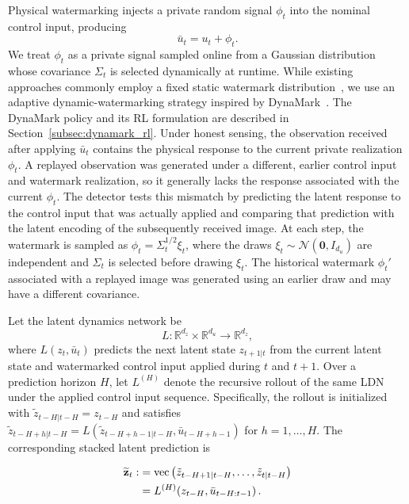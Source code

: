 \documentclass[letterpaper, 10 pt, conference]{ieeeconf}
\theoremstyle{plain}
\begin{document}
Physical watermarking injects a private random signal $\phi_t$ into the nominal control input, producing
\begin{equation}\label{eq:u_phi}
    \bar u_t = u_t + \phi_t.
\end{equation}
We treat $\phi_t$ as a private signal sampled online from a Gaussian distribution whose covariance $\Sigma_t$ is selected dynamically at runtime. While existing approaches commonly employ a fixed static watermark distribution~\cite{mo2009secure,satchidanandan2017dynamic,naha2023sequential}, we use an adaptive dynamic-watermarking strategy inspired by DynaMark~\cite{aftabi2025dynamark}. The DynaMark policy and its RL formulation are described in Section~\ref{subsec:dynamark_rl}.  Under honest sensing, the observation received after applying $\bar u_t$ contains the physical response to the current private realization $\phi_t$. A replayed observation was generated under a different, earlier control input and watermark realization, so it generally lacks the response associated with the current $\phi_t$. The detector tests this mismatch by predicting the latent response to the control input that was actually applied and comparing that prediction with the latent encoding of the subsequently received image. At each step, the watermark is sampled as $\phi_t=\Sigma_t^{1/2}\xi_t$, where the draws $\xi_t\sim\mathcal{N}(\mathbf{0},I_{d_u})$ are independent and $\Sigma_t$ is selected before drawing $\xi_t$. The historical watermark $\phi_t'$ associated with a replayed image was generated using an earlier draw and may have a different covariance.

Let the latent dynamics network be
\begin{equation}\label{eq:ldn_map}
    L:\mathbb{R}^{d_z}\times\mathbb{R}^{d_u}\to\mathbb{R}^{d_z},
\end{equation}
where $L(z_t,\bar u_t)$ predicts the next latent state $z_{t+1|t}$ from the current latent state and watermarked control input applied during $t$ and $t+1$. Over a prediction horizon $H$, let $L^{(H)}$ denote the recursive rollout of the same LDN under the applied control input sequence.
Specifically, the rollout is initialized with $\tilde{z}_{t-H|t-H}=z_{t-H}$ and satisfies $\tilde{z}_{t-H+h|t-H} = L\left(\tilde{z}_{t-H+h-1|t-H}, \bar{u}_{t-H+h-1}\right)$ for $h=1,\dots, H$. The corresponding stacked latent prediction is

\begin{align}
    \widetilde{\mathbf z}_t
    :&=\mathrm{vec}\left(\tilde z_{t-H+1|t-H},\ldots,\tilde z_{t|t-H}\right) \notag\\
    &=L^{(H)}\!\left(z_{t-H},\bar u_{t-H:t-1}\right).\label{eq:ldn}
\end{align}
\end{document}
